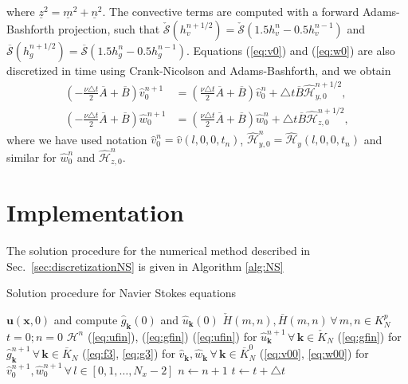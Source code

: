 \documentclass[11pt, oneside]{article}
\newcommand{\N}[1]{\check{#1}}
\newcommand{\D}[1]{\overline{#1}}
\begin{document}
where $\underline{z}^2 = \underline{m}^2 + \underline{n}^2$. The convective 
terms are computed with a forward Adams-Bashforth projection, such that 
$\N{\mathcal{S}}(h_v^{n+1/2}) = 
\N{\mathcal{S}}(1.5h_v^{n} - 0.5 h_v^{n-1})$ and $\D{\mathcal{S}}(h_g^{n+1/2}) 
= \D{\mathcal{S}}(1.5h_g^{n} - 0.5 h_g^{n-1})$. Equations 
(\ref{eq:v0}) and (\ref{eq:w0}) are also discretized in time using 
Crank-Nicolson and Adams-Bashforth, and we obtain
\begin{align}
\left(-\frac{\nu \triangle t}{2}\D{A} + \D{B} \right)\hat{v}_0^{n+1} &= 
\left(\frac{\nu \triangle t}{2}\D{A} + \D{B} 
\right)\hat{v}^{n}_0 + \triangle t\D{B}\hat{\mathcal{H}}_{y,0}^{n+1/2} , 
\label{eq:v00} \\
\left(-\frac{\nu \triangle t}{2}\D{A} + \D{B} \right)\hat{w}_0^{n+1} &= 
\left(\frac{\nu \triangle t}{2}\D{A} + \D{B} 
\right)\hat{w}^{n}_0 + \triangle t\D{B}\hat{\mathcal{H}}_{z,0}^{n+1/2}, 
\label{eq:w00}
\end{align}
where we have used notation $\hat{v}^{n}_0 = \hat{v}(l, 0, 0, t_n)$, 
$\hat{\mathcal{H}}^{n}_{y,0} = \hat{\mathcal{H}}_y(l, 0, 0, t_n)$ and similar 
for $\hat{w}^n_0$ and $\hat{\mathcal{H}}^n_{z,0}$.

\section{Implementation}

The solution procedure for the numerical method described in 
Sec.~\ref{sec:discretizationNS} is given in Algorithm \ref{alg:NS}

\begin{algorithm}
	\caption{Solution procedure for Navier Stokes equations}
    \label{alg:NS}
    \begin{algorithmic}[1]
    	\State {} $\bm{u}(\bm{x}, 0)$ and compute 
    	$\hat{g}_{\bm{k}}(0)$ and $\hat{u}_{\bm{k}}(0)$
		\State {} $\N{H}(m,n), \D{H}(m,n) 
		\,\forall \, m, n \in K_N^p$
		\State $t=0; n=0$
	    	\State {} $\bm{\mathcal{H}}^n$
	    	\State {}(\ref{eq:ufin}), 
	    	(\ref{eq:gfin})
		    \State {}(\ref{eq:ufin}) for 
		    $\hat{u}^{n+1}_{\bm{k}} \, \forall \,\bm{k} \in \N{K}_N$
		    \State {}(\ref{eq:gfin}) for 
		    $\hat{g}^{n+1}_{\bm{k}} \, \forall\, \bm{k} \in \D{K}_N$
		    \State {}(\ref{eq:f3}, \ref{eq:g3}) for  
		    $\hat{v}_{\bm{k}}, \hat{w}_{\bm{k}}\, \forall\, \bm{k} 
		    \in \D{K}_N^0$
		    \State {}(\ref{eq:v00}, \ref{eq:w00}) for 
		    $\hat{v}_0^{n+1}, \hat{w}_0^{n+1}\, 
		    \forall \, l \in [0, 1, \ldots, N_x-2] $
		    \State $n \gets n + 1$
		    \State $t \gets t+\triangle t$
		    \State {}
	    \EndWhile 
	    	
    \end{algorithmic}
\end{algorithm}
\end{document}
